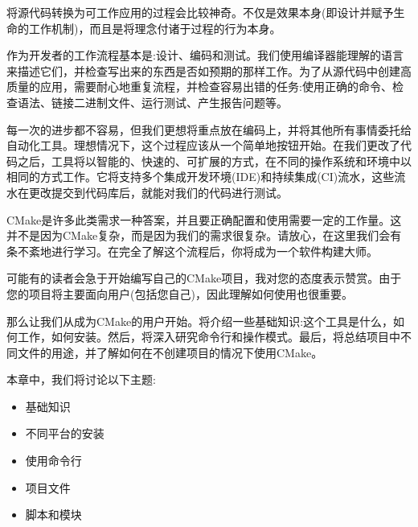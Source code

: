 将源代码转换为可工作应用的过程会比较神奇。不仅是效果本身(即设计并赋予生命的工作机制)，而且是将理念付诸于过程的行为本身。

作为开发者的工作流程基本是:设计、编码和测试。我们使用编译器能理解的语言来描述它们，并检查写出来的东西是否如预期的那样工作。为了从源代码中创建高质量的应用，需要耐心地重复流程，并检查容易出错的任务:使用正确的命令、检查语法、链接二进制文件、运行测试、产生报告问题等。

每一次的进步都不容易，但我们更想将重点放在编码上，并将其他所有事情委托给自动化工具。理想情况下，这个过程应该从一个简单地按钮开始。在我们更改了代码之后，工具将以智能的、快速的、可扩展的方式，在不同的操作系统和环境中以相同的方式工作。它将支持多个集成开发环境(IDE)和持续集成(CI)流水，这些流水在更改提交到代码库后，就能对我们的代码进行测试。

CMake是许多此类需求一种答案，并且要正确配置和使用需要一定的工作量。这并不是因为CMake复杂，而是因为我们的需求很复杂。请放心，在这里我们会有条不紊地进行学习。在完全了解这个流程后，你将成为一个软件构建大师。

可能有的读者会急于开始编写自己的CMake项目，我对您的态度表示赞赏。由于您的项目将主要面向用户(包括您自己)，因此理解如何使用也很重要。

那么让我们从成为CMake的用户开始。将介绍一些基础知识:这个工具是什么，如何工作，如何安装。然后，将深入研究命令行和操作模式。最后，将总结项目中不同文件的用途，并了解如何在不创建项目的情况下使用CMake。

本章中，我们将讨论以下主题:

\begin{itemize}
\item 
基础知识

\item 
不同平台的安装

\item 
使用命令行

\item 
项目文件

\item 
脚本和模块
\end{itemize}

